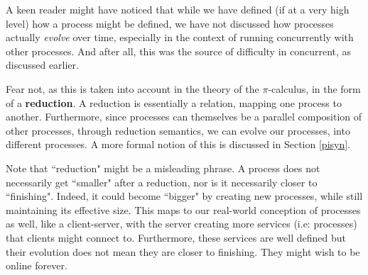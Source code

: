 A keen reader might have noticed that while we have defined (if at a very high level) how a process might be defined, we have not discussed how processes actually \textit{evolve} over time, especially in the context of running concurrently with other processes. And after all, this was the source of difficulty in concurrent, as discussed earlier.

Fear not, as this is taken into account in the theory of the $\pi$-calculus, in the form of a \textbf{reduction}. A reduction is essentially a relation, mapping one process to another. Furthermore, since processes can themselves be a parallel composition of other processes, through reduction semantics, we can evolve our processes, into different processes. A more formal notion of this is discussed in Section \ref{pisyn}.

Note that ``reduction" might be a misleading phrase. A process does not necessarily get ``smaller" after a reduction, nor is it necessarily closer to ``finishing". Indeed, it could become ``bigger" by creating new processes, while still maintaining its effective size. This maps to our real-world conception of processes as well, like a client-server, with the server creating more services (i.e: processes) that clients might connect to. Furthermore, these services are well defined but their evolution does not mean they are closer to finishing. They might wish to be online forever.